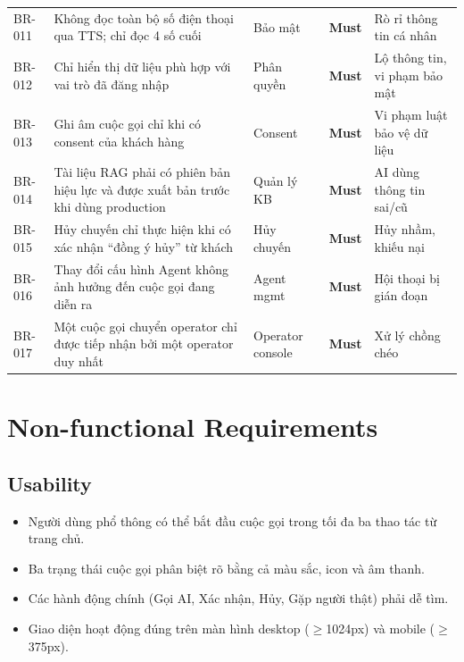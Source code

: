 \documentclass[12pt,a4paper]{article}
\newcommand{\musthave}{\colorbox{PrioMust}{\small\textbf{Must}}}
\begin{document}
\begin{longtable}{C{1.5cm} L{4.5cm} L{3.5cm} C{1.8cm} L{4cm}}
  BR-011 & Không đọc toàn bộ số điện thoại qua TTS; chỉ đọc 4 số cuối & Bảo mật & \musthave & Rò rỉ thông tin cá nhân \\
  BR-012 & Chỉ hiển thị dữ liệu phù hợp với vai trò đã đăng nhập & Phân quyền & \musthave & Lộ thông tin, vi phạm bảo mật \\
  BR-013 & Ghi âm cuộc gọi chỉ khi có consent của khách hàng & Consent & \musthave & Vi phạm luật bảo vệ dữ liệu \\
  BR-014 & Tài liệu RAG phải có phiên bản hiệu lực và được xuất bản trước khi dùng production & Quản lý KB & \musthave & AI dùng thông tin sai/cũ \\
  BR-015 & Hủy chuyến chỉ thực hiện khi có xác nhận ``đồng ý hủy'' từ khách & Hủy chuyến & \musthave & Hủy nhầm, khiếu nại \\
  BR-016 & Thay đổi cấu hình Agent không ảnh hưởng đến cuộc gọi đang diễn ra & Agent mgmt & \musthave & Hội thoại bị gián đoạn \\
  BR-017 & Một cuộc gọi chuyển operator chỉ được tiếp nhận bởi một operator duy nhất & Operator console & \musthave & Xử lý chồng chéo \\
\end{longtable}

\section{Non-functional Requirements}

\subsection{Usability}
\begin{itemize}
  \item Người dùng phổ thông có thể bắt đầu cuộc gọi trong tối đa ba thao tác từ trang chủ.
  \item Ba trạng thái cuộc gọi phân biệt rõ bằng cả màu sắc, icon và âm thanh.
  \item Các hành động chính (Gọi AI, Xác nhận, Hủy, Gặp người thật) phải dễ tìm.
  \item Giao diện hoạt động đúng trên màn hình desktop ($\geq$1024px) và mobile ($\geq$375px).
\end{itemize}
\end{document}
